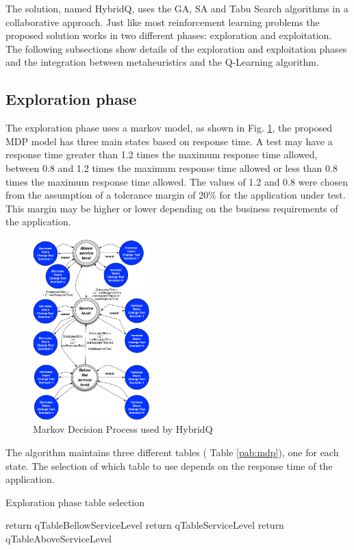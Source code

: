 \documentclass[espaco=umemeio,chapter=TITLE,twoside,openright]{abnt}
\begin{document}
The solution, named HybridQ, uses the GA, SA and Tabu Search algorithms in a collaborative approach. Just like most reinforcement learning problems the proposed solution works in two different phases: exploration and exploitation. The following subsections show details of the exploration and exploitation phases and the integration between metaheuristics and the Q-Learning algorithm.


\subsection{Exploration phase}

The exploration phase uses a markov model, as shown in Fig. \ref{fig:mdphybridq}, the proposed MDP model  has three main states based on response time. A test may have a response time greater than 1.2 times the maximum response time allowed, between 0.8 and 1.2 times the maximum response time allowed or less than 0.8 times the maximum response time allowed. The values of 1.2 and 0.8 were chosen from the assumption of a tolerance margin of 20\% for the application under test. This margin may be higher or lower depending on the business requirements of the application.


\begin{figure}[h!]
\center
\includegraphics[width=0.4\textwidth]{./images/mdp3.png}
\caption{Markov Decision Process used by HybridQ}
\label{fig:mdphybridq}
\end{figure}


The algorithm maintains three different tables ( Table \ref{pab:mdp}), one for each state. The selection of which table to use depends on the response time of the application.

\begin{algorithm}[h]
  \caption{Exploration phase table selection }\label{hybridqexploration}
  \begin{algorithmic}[1]    
    \State return qTableBellowServiceLevel       
    \EndIf
    \State return qTableServiceLevel  
    \EndIf
    \State return qTableAboveServiceLevel  
    \EndIf
  \end{algorithmic}
\end{algorithm}
\end{document}
